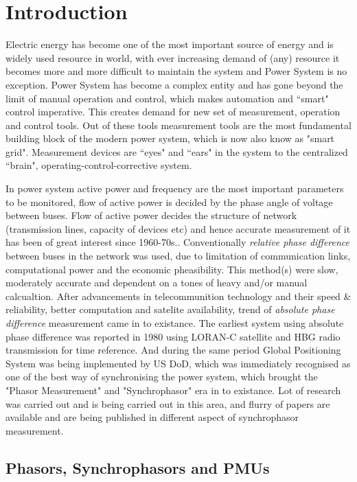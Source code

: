 \chapter{Introduction}
\setcounter{page}{1}

Electric energy has become one of the most important source of energy and is widely used resource in world, with ever increasing demand of (any) resource it becomes more and more difficult to maintain the system and Power System is no exception. Power System has become a complex entity and has gone beyond the limit of manual operation and control, which makes automation and ``smart" control imperative. This creates demand for new set of measurement, operation and control tools. Out of these tools measurement tools are the most fundamental building block of the modern power system, which is now also know as "smart grid". Measurement devices are ``eyes" and ``ears" in the system to the centralized ``brain", operating-control-corrective system.  

In power system active power and frequency are the most important parameters to be monitored, flow of active power is decided by the phase angle of voltage between buses. Flow of active power decides the structure of network (transmission lines, capacity of devices etc) and hence accurate measurement of it has been of great interest since 1960-70s.\cite{agphadkebook}. Conventionally \textit{relative phase difference} between buses in the network was used, due to limitation of communication links, computational power and the economic pheasibility. This method(s) were slow, moderately accurate and dependent on a tones of heavy and/or manual calcualtion. 
After advancements in telecommunition technology and their speed \& reliability, better computation and satelite availability, trend of \textit{absolute phase difference} measurement came in to existance. The earliest system using absolute phase difference was reported in 1980 using LORAN-C satellite and HBG radio transmission for time reference. And during the same period Global Positioning System was being implemented by US DoD, which was immediately recognised as one of the best way of synchronising the power system, which brought the "Phasor Measurement" and "Synchrophasor" era in to existance. Lot of research was carried out and is being carried out in this area, and flurry of papers are available and are being published in different aspect of synchrophasor measurement. 
\section{Phasors, Synchrophasors and PMUs}
